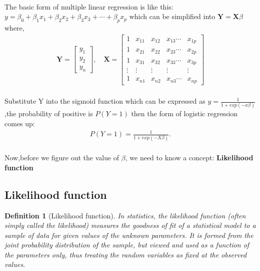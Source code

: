 \documentclass[a4paper,12pt]{article}
\newtheorem{definition}{Definition}[section]
\begin{document}
\begin{spacing}{2}
\paragraph{ }The basic form of multiple linear regression is like this:
$y=\beta_{0}+\beta_{1}x_{1}+\beta_{2}x_{2}+\beta_{3}x_{3}+\cdots+\beta_{p}x_{p}$ which can be simplified into $\textbf{Y}=\textbf{X}\beta$ where,
\begin{align}
\textbf{Y}=\begin{bmatrix}
y_{1}\\
y_{2}\\
y_{n}
\end{bmatrix},\quad \textbf{X}=\begin{bmatrix}
1&x_{11}&x_{12}&x_{13}\cdots&x_{1p}\\
1&x_{21}&x_{22}&x_{23}\cdots&x_{2p}\\
1&x_{31}&x_{32}&x_{33}\cdots&x_{3p}\\
\vdots&\vdots&\vdots&\vdots&\vdots\\
1&x_{n1}&x_{n2}&x_{n3}\cdots&x_{np}
\end{bmatrix}
\end{align}
\paragraph{ }Substitute Y into the sigmoid function which can be expressed as $y=\frac{1}{1+exp(-x\beta)}$,the probability of positive is $P(Y=1)$ then the form of logistic regression comes up:
\begin{align}
P(Y=1)=\frac{1}{1+exp(-X\beta)}.
\end{align}
\paragraph{ }Now,before we figure out the value of $\beta$, we need to know a concept: \textbf{Likelihood function}
\subsection{Likelihood function}
\begin{definition}[Likelihood function]
In statistics, the likelihood function (often simply called the likelihood) measures the goodness of fit of a statistical model to a sample of data for given values of the unknown parameters. It is formed from the joint probability distribution of the sample, but viewed and used as a function of the parameters only, thus treating the random variables as fixed at the observed values.
\end{definition}

\end{spacing}
\end{document}
